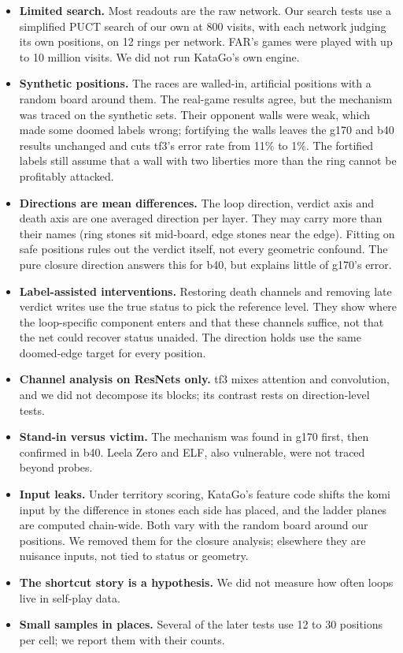 \documentclass[11pt]{article}
\begin{document}
\begin{itemize}
\item \textbf{Limited search.} Most readouts are the raw network. Our search tests use a simplified PUCT search of our own at 800 visits, with each network judging its own positions, on 12 rings per network. FAR's games were played with up to 10 million visits. We did not run KataGo's own engine.
\item \textbf{Synthetic positions.} The races are walled-in, artificial positions with a random board around them. The real-game results agree, but the mechanism was traced on the synthetic sets. Their opponent walls were weak, which made some doomed labels wrong; fortifying the walls leaves the g170 and b40 results unchanged and cuts tf3's error rate from 11\% to 1\%. The fortified labels still assume that a wall with two liberties more than the ring cannot be profitably attacked.
\item \textbf{Directions are mean differences.} The loop direction, verdict axis and death axis are one averaged direction per layer. They may carry more than their names (ring stones sit mid-board, edge stones near the edge). Fitting on safe positions rules out the verdict itself, not every geometric confound. The pure closure direction answers this for b40, but explains little of g170's error.
\item \textbf{Label-assisted interventions.} Restoring death channels and removing late verdict writes use the true status to pick the reference level. They show where the loop-specific component enters and that these channels suffice, not that the net could recover status unaided. The direction holds use the same doomed-edge target for every position.
\item \textbf{Channel analysis on ResNets only.} tf3 mixes attention and convolution, and we did not decompose its blocks; its contrast rests on direction-level tests.
\item \textbf{Stand-in versus victim.} The mechanism was found in g170 first, then confirmed in b40. Leela Zero and ELF, also vulnerable, were not traced beyond probes.
\item \textbf{Input leaks.} Under territory scoring, KataGo's feature code shifts the komi input by the difference in stones each side has placed, and the ladder planes are computed chain-wide. Both vary with the random board around our positions. We removed them for the closure analysis; elsewhere they are nuisance inputs, not tied to status or geometry.
\item \textbf{The shortcut story is a hypothesis.} We did not measure how often loops live in self-play data.
\item \textbf{Small samples in places.} Several of the later tests use 12 to 30 positions per cell; we report them with their counts.
\end{itemize}
\end{document}
